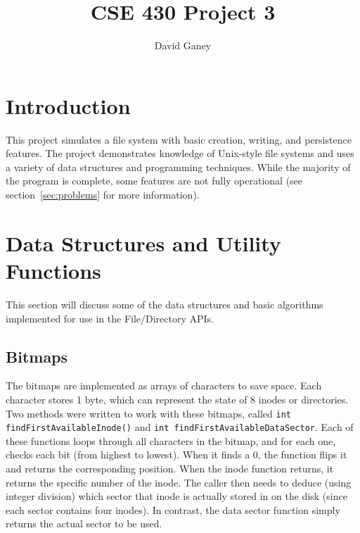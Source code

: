\documentclass[]{article}
\begin{document}
\lstset{language=C++}

\begin{spacing}{.4}
\setlength{\droptitle}{-7em}
\title{CSE 430 Project 3}
\author{David Ganey}
\maketitle
\end{spacing}

\section{Introduction}
This project simulates a file system with basic creation, writing, and persistence features. The project demonstrates knowledge of Unix-style file systems and uses a variety of data structures and programming techniques. While the majority of the program is complete, some features are not fully operational (see section~\ref{sec:problems} for more information).

\section{Data Structures and Utility Functions}
This section will discuss some of the data structures and basic algorithms implemented for use in the File/Directory APIs.

\subsection{Bitmaps}
The bitmaps are implemented as arrays of characters to save space. Each character stores 1 byte, which can represent the state of 8 inodes or directories. Two methods were written to work with these bitmaps, called \texttt{int findFirstAvailableInode()} and \texttt{int findFirstAvailableDataSector}. Each of these functions loops through all characters in the bitmap, and for each one, checks each bit (from highest to lowest). When it finds a 0, the function flips it and returns the corresponding position. When the inode function returns, it returns the specific number of the inode. The caller then needs to deduce (using integer division) which sector that inode is actually stored in on the disk (since each sector contains four inodes). In contrast, the data sector function simply returns the actual sector to be used.
\end{document}
